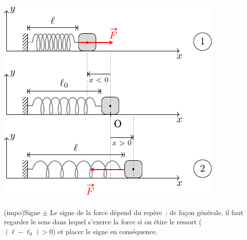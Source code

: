 \documentclass[../../main/main.tex]{subfiles}
\begin{document}
\begin{tcb*}[sidebyside, righthand ratio=.45]
\begin{center}
{			\includegraphics[width=\linewidth]{ressort_def}
		}
		\vspace{-15pt}
	\end{center}
\end{tcb*}

\begin{tcb*}(impo){Signe $\pm$}
	Le signe de la force dépend du repère~: de façon générale, il faut
	regarder le sens dans lequel s’exerce la force si on étire le ressort ($(\ell
		- \ell_0) > 0$) et placer le signe en conséquence.
\end{tcb*}
\end{document}
